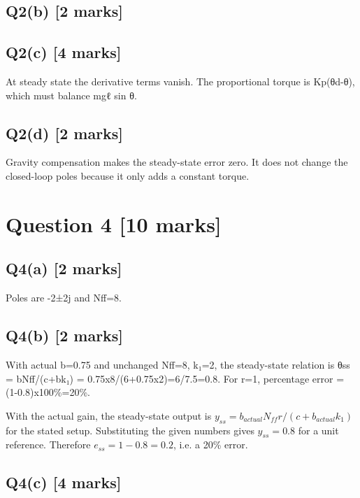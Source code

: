 \documentclass[11pt,a4paper]{article}
\begin{document}
\subsection*{Q2(b) \hfill [2 marks]}

\vspace{2mm}

\subsection*{Q2(c) \hfill [4 marks]}

At steady state the derivative terms vanish.
The proportional torque is Kp(θd-θ), which must balance mgℓ sin θ.

\subsection*{Q2(d) \hfill [2 marks]}

Gravity compensation makes the steady-state error zero.
It does not change the closed-loop poles because it only adds a constant torque.

\section*{Question 4 \hfill [10 marks]}
\subsection*{Q4(a) \hfill [2 marks]}

Poles are -2±2j and Nff=8.

\subsection*{Q4(b) \hfill [2 marks]}

With actual b=0.75 and unchanged Nff=8, k₁=2, the steady-state relation is θss = bNff/(c+bk₁) = 0.75x8/(6+0.75x2)=6/7.5=0.8.
For r=1, percentage error = (1-0.8)x100\%=20\%.\par\smallskip With the actual gain, the steady-state output is $y_{ss}=b_{actual}N_{ff}r/ (c+b_{actual}k_1)$ for the stated setup. Substituting the given numbers gives $y_{ss}=0.8$ for a unit reference. Therefore $e_{ss}=1-0.8=0.2$, i.e. a 20\% error.

\subsection*{Q4(c) \hfill [4 marks]}
\end{document}

